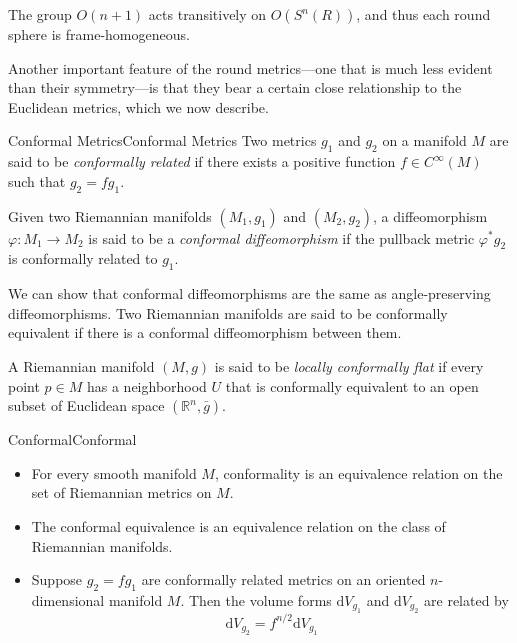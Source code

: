 \documentclass[../main.tex]{subfiles}
\begin{document}
\begin{proposition}{}{}
	The group $O(n+1)$ acts transitively on $O(S^n(R))$, and thus each round sphere is frame-homogeneous.
\end{proposition}

Another important feature of the round metrics—one that is much less evident than their symmetry—is that they bear a certain close relationship to the Euclidean metrics, which we now describe.
\begin{definition}{Conformal Metrics}{Conformal Metrics}
	Two metrics $g_1$ and $g_2$ on a manifold $M$ are said to be \emph{conformally related} if there exists a positive function $f \in C^{\infty}(M)$ such that $g_2 = f g_1$.

	Given two Riemannian manifolds $(M_1, g_1)$ and $(M_2, g_2)$, a diffeomorphism $\varphi: M_1 \to M_2$ is said to be a \emph{conformal diffeomorphism} if the pullback metric $\varphi^* g_2$ is conformally related to $g_1$.
\end{definition}

We can show that conformal diffeomorphisms are the same as angle-preserving diffeomorphisms. Two Riemannian manifolds are said to be conformally equivalent if there is a conformal diffeomorphism between them.

A Riemannian manifold $(M,g)$ is said to be \emph{locally conformally flat} if every point $p \in M$ has a neighborhood $U$ that is conformally equivalent to an open subset of Euclidean space $(\mathbb{R}^n, \bar{g})$.

\begin{proposition}{Conformal}{Conformal}
	\begin{itemize}
		\item For every smooth manifold $M$, conformality is an equivalence relation on the set of Riemannian metrics on $M$.
		\item The conformal equivalence is an equivalence relation on the class of Riemannian manifolds.
		\item Suppose $g_2=fg_1$ are conformally related metrics on an oriented $n$-dimensional manifold $M$. Then the volume forms $\mathrm{d} V_{g_1}$ and $\mathrm{d} V_{g_2}$ are related by
		      \begin{equation}
			      \mathrm{d} V_{g_2} = f^{n/2} \mathrm{d} V_{g_1}
		      \end{equation}
	\end{itemize}
\end{proposition}
\end{document}
